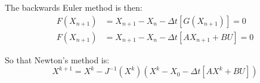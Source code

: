 \documentclass[11pt]{article}
\begin{document}
The backwards Euler method is then:
\begin{subequations}
  \begin{align}
    F(X_{n+1}) &= X_{n+1} - X_n - \Delta t \left[G\left(X_{n+1}\right)\right] = 0 \\
    F(X_{n+1}) &= X_{n+1} - X_n - \Delta t \left[A X_{n+1} + B U\right] = 0
  \end{align}
\end{subequations}

So that Newton's method is:
\begin{equation}
    X^{k+1} = X^k - J^{-1}({X^k})\left(X^k - X_0 - \Delta t \left[A X^k + B U\right]\right)
\end{equation}


\end{document}

